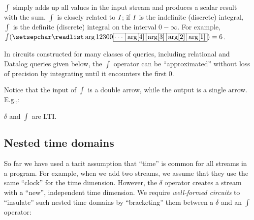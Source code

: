 $\int$ simply adds up all values in the input stream
and produces a scalar result with the sum.  $\int$ is closely related
to $\mathit{I}$; if $\mathit{I}$ is the indefinite (discrete) integral, $\int$ is the
definite (discrete) integral on the interval $0 - \infty$.  For
example, $\int(\sv{1 2 3 0 0}) = 6$.

In circuits constructed for many classes of queries, including
relational and Datalog queries given below, the $\int$ operator can be
``approximated'' without loss of precision by integrating until it
encounters the first 0.

Notice that the input of $\int$ is a double arrow, while the output is
a single arrow.  E.g.,:

\begin{center}
\end{center}

\begin{proposition}
$\delta$ and $\int$ are LTI.
\end{proposition}

\vspace{-3ex}
\subsection{Nested time domains}

So far we have used a tacit assumption that ``time'' is common for all
streams in a program.  For example, when we add two streams, we assume
that they use the same ``clock'' for the time dimension.  However, the
$\delta$ operator creates a stream with a ``new'', independent time
dimension.  We require \emph{well-formed circuits} to ``insulate''
such nested time domains by ``bracketing'' them between a $\delta$ and
an $\int$ operator:

\begin{center}
\end{center}

